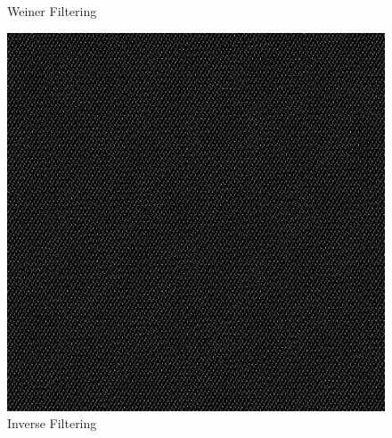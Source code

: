 \documentclass{article}
\begin{document}
\begin{figure}[!htb]
      \caption{Weiner Filtering}
    \endminipage\hfill
      \includegraphics[scale=.28]{./deblurring/0_01/inverse.png}
      \caption{Inverse Filtering}
    \endminipage
    \end{figure}
    \bigbreak
    \\[5pt]
\end{document}
